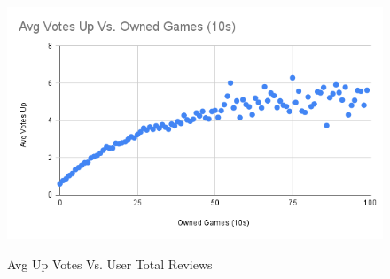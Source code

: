 \begin{figure}[H]
    \centering{}
    \caption{Avg Up Votes Vs. User Total Reviews}

    \includegraphics[width=0.8\linewidth]{visuals/Avg Votes Up Vs. Owned Games (10s)}
    \label{fig:Average Up Votes Vs. Num Games Owned (10s)}
\end{figure}

